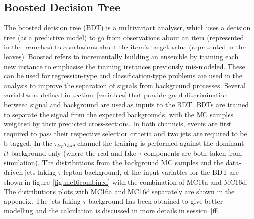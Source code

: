 \subsection{Boosted Decision Tree}
\label{7.3}
The boosted decision tree (BDT) is a multivariant analyser, which uses a decision tree (as a predictive model) to go from observations about an item (represented in the branches) to conclusions about the item's target value (represented in the leaves). Boosted refers to incrementally building an ensemble by training each new instance to emphasise the training instances previously mis-modeled\cite{BDT1}. These can be used for regression-type and classification-type problems are used in the analysis to improve the separation of signals from background processes. Several variables as defined in section~\ref{variables} that provide good discrimination between signal and background are used as inputs to the BDT. BDTs are trained to separate the signal from the expected backgrounds, with the MC samples weighted by their predicted cross-sections. In both channels, events are first required to pass their respective selection criteria and two jets are required to be b-tagged. In the $\tau_{lep}\tau_{had}$ channel the training is performed against the dominant $t\bar{t}$ background only (where the real and fake $\tau$ components are both taken from simulation). The distributions from the background MC samples and the data-driven jets faking $\tau$ lepton background, of the input variables for the BDT are shown in figure~\ref{fig:mc16combined} with the combination of MC16a and MC16d. The distributions plots with MC16a and MC16d separately are shown in the appendix. The jets faking $\tau$ background has been obtained to give better modelling and the calculation is discussed in more details in session~\ref{ff}.













